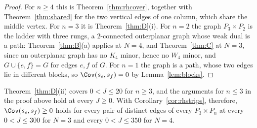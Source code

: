 \begin{proof}
For $n\ge4$ this is Theorem~\ref{thm:rhcover}, together with Theorem~\ref{thm:shared} for the two vertical edges of one column, which share the middle
vertex. For $n=3$ it is Theorem~\ref{thm:D}(i). For $n=2$ the graph $P_3\times P_2$ is the ladder with three rungs, a $2$-connected outerplanar graph
whose weak dual is a path: Theorem~\ref{thm:B}(a) applies at $N=4$, and Theorem~\ref{thm:C} at $N=3$, since an outerplanar graph has no $K_4$ minor,
hence no $W_4$ minor, and $G\cup\{e,f\}=G$ for edges $e,f$ of $G$. For $n=1$ the graph is a path, whose two edges lie in different blocks, so
$\Cov(s_e,s_f)=0$ by Lemma~\ref{lem:blocks}.
\end{proof}

\noindent Theorem~\ref{thm:D}(ii) covers $0<J\le20$ for $n\ge3$, and the arguments for $n\le3$ in the proof above hold at every $J\ge0$. With
Corollary~\ref{cor:rhstrips}, therefore,
$\Cov(s_e,s_f)\ge0$ holds for every pair of distinct edges of every $P_3\times P_n$ at every $0<J\le300$ for $N=3$ and every $0<J\le350$ for $N=4$.
